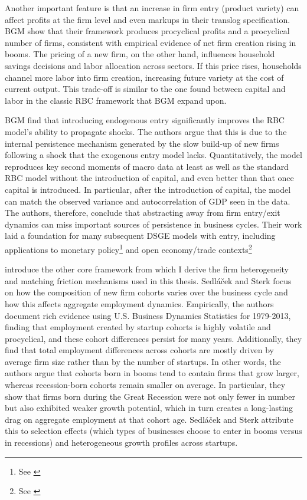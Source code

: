 \documentclass[a4paper,12pt]{article} %
\numberwithin{equation}{section} %
\numberwithin{figure}{section}
\numberwithin{table}{section}
\begin{document}
Another important feature is that an increase in firm entry (product variety) can affect profits at the firm level and even markups in their translog specification. 
BGM show that their framework produces procyclical profits and a procyclical number of firms, consistent with empirical evidence of net firm creation rising in booms. 
The pricing of a new firm, on the other hand, influences household savings decisions and labor allocation across sectors. If this price rises, households channel more 
labor into firm creation, increasing future variety at the cost of current output. This trade-off is similar to the one found between capital and labor in the classic 
RBC framework that BGM expand upon.

BGM find that introducing endogenous entry significantly improves the RBC model's ability to propagate shocks. The authors argue that this is due to the internal 
persistence mechanism generated by the slow build-up of new firms following a shock that the exogenous entry model lacks. Quantitatively, the model reproduces key 
second moments of macro data at least as well as the standard RBC model without the introduction of capital, and even better than that once capital is introduced. 
In particular, after the introduction of capital, the model can match the observed variance and autocorrelation of GDP seen in the data. The authors, therefore, 
conclude that abstracting away from firm entry/exit dynamics can miss important sources of persistence in business cycles. Their work laid a foundation for many 
subsequent DSGE models with entry, including applications to monetary policy\footnote{See \textcite{bilbiie2007monetary,bergin2008extensive,etro2015new}} and 
open economy/trade contexts\footnote{See \textcite{epifani2011trade,bergin2015international}}

\textcite{sedlavcek2017growth} introduce the other core framework from which I derive the firm heterogeneity and matching friction mechanisms used in this thesis. 
Sedláček and Sterk focus on how the composition of new firm cohorts varies over the business cycle and how this affects aggregate employment dynamics. 
Empirically, the authors document rich evidence using U.S. Business Dynamics Statistics for 1979-2013, finding that employment created by startup cohorts is highly
volatile and procyclical, and these cohort differences persist for many years. Additionally, they find that total employment differences across cohorts are mostly
driven by average firm size rather than by the number of startups. In other words, the authors argue that cohorts born in booms tend to contain firms that grow
larger, whereas recession-born cohorts remain smaller on average. In particular, they show that firms born during the Great Recession were not only fewer in 
number but also exhibited weaker growth potential, which in turn creates a long-lasting drag on aggregate employment at that cohort age. Sedláček and Sterk 
attribute this to selection effects (which types of businesses choose to enter in booms versus in recessions) and heterogeneous growth profiles across startups.
\end{document}
